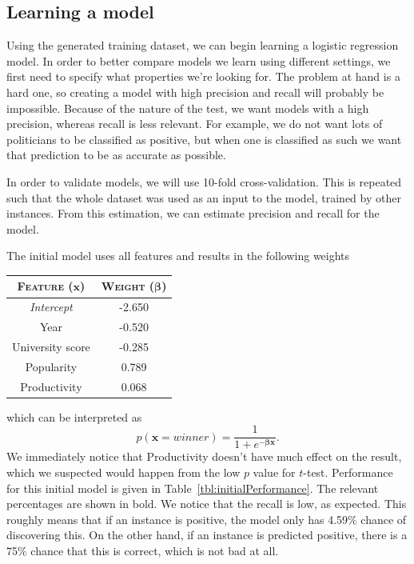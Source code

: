\subsection{Learning a model}
Using the generated training dataset, we can begin learning a logistic regression model. In order to better compare models we learn using different settings, we first need to specify what properties we're looking for. The problem at hand is a hard one, so creating a model with high precision and recall will probably be impossible. Because of the nature of the test, we want models with a high precision, whereas recall is less relevant. For example, we do not want lots of politicians to be classified as positive, but when one is classified as such we want that prediction to be as accurate as possible.

In order to validate models, we will use 10-fold cross-validation. This is repeated such that the whole dataset was used as an input to the model, trained by other instances. From this estimation, we can estimate precision and recall for the model.

The initial model uses all features and results in the following weights
\begin{table}[H]
\centering
\begin{tabular}{c|c}
\textsc{\textbf{Feature}} ($\mathbf{x}$) & \textsc{\textbf{Weight}} ($\boldsymbol{\beta}$)\\ \hline
\rule{0pt}{4mm}\emph{Intercept}&-2.650\\
Year&-0.520\\
University score&-0.285\\
Popularity&0.789\\
Productivity&0.068\\
\end{tabular}
\end{table}
\noindent which can be interpreted as 
\begin{equation*}
	p(\mathbf{x} = winner) = \frac{1}{1 + e^{-\boldsymbol{\beta}\mathbf{x}}}.
\end{equation*}
We immediately notice that Productivity doesn't have much effect on the result, which we suspected would happen from the low $p$ value for $t$-test. Performance for this initial model is given in Table~\ref{tbl:initialPerformance}. The relevant percentages are shown in bold. We notice that the recall is low, as expected. This roughly means that if an instance is positive, the model only has 4.59\% chance of discovering this. On the other hand, if an instance is predicted positive, there is a 75\% chance that this is correct, which is not bad at all. 


